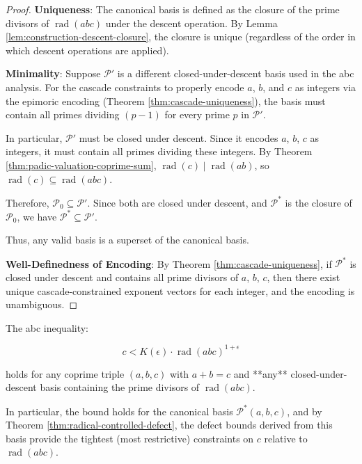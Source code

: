 \begin{proof}

\noindent \textbf{Uniqueness}: The canonical basis is defined as the closure of the prime divisors of $\operatorname{rad}(abc)$ under the descent operation. By Lemma \ref{lem:construction-descent-closure}, the closure is unique (regardless of the order in which descent operations are applied).

\noindent \textbf{Minimality}: Suppose $\mathcal{P}'$ is a different closed-under-descent basis used in the abc analysis. For the cascade constraints to properly encode $a$, $b$, and $c$ as integers via the epimoric encoding (Theorem \ref{thm:cascade-uniqueness}), the basis must contain all primes dividing $(p - 1)$ for every prime $p$ in $\mathcal{P}'$.

In particular, $\mathcal{P}'$ must be closed under descent. Since it encodes $a$, $b$, $c$ as integers, it must contain all primes dividing these integers. By Theorem \ref{thm:padic-valuation-coprime-sum}, $\operatorname{rad}(c) \mid \operatorname{rad}(ab)$, so $\operatorname{rad}(c) \subseteq \operatorname{rad}(abc)$.

Therefore, $\mathcal{P}_0 \subseteq \mathcal{P}'$. Since both are closed under descent, and $\mathcal{P}^*$ is the closure of $\mathcal{P}_0$, we have $\mathcal{P}^* \subseteq \mathcal{P}'$.

Thus, any valid basis is a superset of the canonical basis.

\noindent \textbf{Well-Definedness of Encoding}: By Theorem \ref{thm:cascade-uniqueness}, if $\mathcal{P}^*$ is closed under descent and contains all prime divisors of $a$, $b$, $c$, then there exist unique cascade-constrained exponent vectors for each integer, and the encoding is unambiguous.

\end{proof}

\begin{corollary}
\label{cor:abc-basis-independent}

The abc inequality:

\begin{equation}
c < K(\epsilon) \cdot \operatorname{rad}(abc)^{1+\epsilon}
\end{equation}

holds for any coprime triple $(a,b,c)$ with $a+b=c$ and **any** closed-under-descent basis containing the prime divisors of $\operatorname{rad}(abc)$.

In particular, the bound holds for the canonical basis $\mathcal{P}^*(a,b,c)$, and by Theorem \ref{thm:radical-controlled-defect}, the defect bounds derived from this basis provide the tightest (most restrictive) constraints on $c$ relative to $\operatorname{rad}(abc)$.

\end{corollary}

